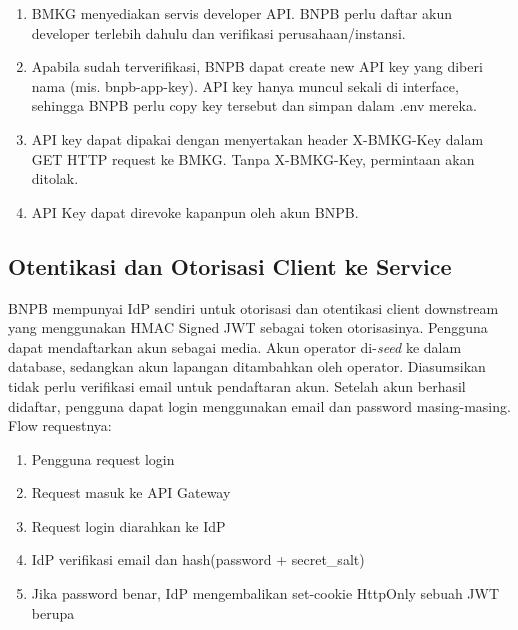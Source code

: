 \begin{enumerate}
\def\labelenumi{\arabic{enumi}.}
\tightlist
\item
  BMKG menyediakan servis developer API. BNPB perlu daftar akun developer terlebih dahulu dan verifikasi perusahaan/instansi.\\
\item
  Apabila sudah terverifikasi, BNPB dapat create new API key yang diberi nama (mis. bnpb-app-key). API key hanya muncul sekali di interface, sehingga BNPB perlu copy key tersebut dan simpan dalam .env mereka.\\
\item
  API key dapat dipakai dengan menyertakan header X-BMKG-Key dalam GET HTTP request ke BMKG. Tanpa X-BMKG-Key, permintaan akan ditolak.\\
\item
  API Key dapat direvoke kapanpun oleh akun BNPB.
\end{enumerate}

\subsection{Otentikasi dan Otorisasi Client ke Service}

BNPB mempunyai IdP sendiri untuk otorisasi dan otentikasi client downstream yang menggunakan HMAC Signed JWT sebagai token otorisasinya. Pengguna dapat mendaftarkan akun sebagai media. Akun operator di-\emph{seed} ke dalam database, sedangkan akun lapangan ditambahkan oleh operator. Diasumsikan tidak perlu verifikasi email untuk pendaftaran akun. Setelah akun berhasil didaftar, pengguna dapat login menggunakan email dan password masing-masing. Flow requestnya:

\begin{enumerate}
\def\labelenumi{\arabic{enumi}.}
\tightlist
\item
  Pengguna request login\\
\item
  Request masuk ke API Gateway\\
\item
  Request login diarahkan ke IdP\\
\item
  IdP verifikasi email dan hash(password + secret\_salt)\\
\item
  Jika password benar, IdP mengembalikan set-cookie HttpOnly sebuah JWT berupa
\end{enumerate}


